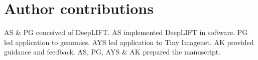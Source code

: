 \documentclass{article}
\begin{document}
\section{Author contributions}

AS \& PG conceived of DeepLIFT. AS implemented DeepLIFT in software. PG led application to genomics. AYS led application to Tiny Imagenet. AK provided guidance and feedback. AS, PG, AYS \& AK prepared the manuscript.

\nocite{*}


\end{document}
